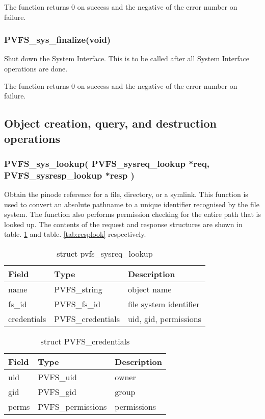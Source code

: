 \documentclass[11pt, letterpaper]{article}
\begin{document}
The function returns 0 on success and the negative of the error number
on failure.	

\subsubsection{PVFS\_sys\_finalize(void)}

Shut down the System Interface. This is to be called after all 
System Interface operations are done.

The function returns 0 on success and the negative of the error number
on failure.	

\subsection{Object creation, query, and destruction operations}

\subsubsection{PVFS\_sys\_lookup(
PVFS\_sysreq\_lookup *req,
PVFS\_sysresp\_lookup *resp
)}

Obtain the pinode reference for a file, directory, or a symlink.
This function is used to convert an absolute pathname to a unique
identifier recognised by the file system. The function also performs
permission checking for the entire path that is looked up. The
contents of the request and response structures are shown in
table. \ref{tab:reqlook} and table. \ref{tab:resplook} respectively.

\begin{table}[H]
\begin{tabular}{|l|l|l|}
\hline
Field & Type & Description \\
\hline
\hline
name & PVFS\_string & object name \\
\hline
fs\_id & PVFS\_fs\_id & file system identifier \\
\hline
credentials & PVFS\_credentials & uid, gid, permissions \\
\hline
\end{tabular}
\caption{struct pvfs\_sysreq\_lookup}\label{tab:reqlook}
\end{table}

\begin{table}[H]
\begin{tabular}{|l|l|l|}
\hline
Field & Type & Description \\
\hline
\hline
uid & PVFS\_uid & owner \\ 
\hline
gid & PVFS\_gid & group \\
\hline
perms & PVFS\_permissions & permissions \\
\hline
\end{tabular}
\caption{struct PVFS\_credentials}\label{tab:cred}
\end{table}
\end{document}
